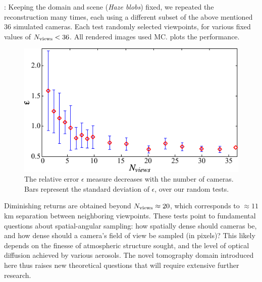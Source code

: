 \documentclass[10pt,letterpaper]{article}
\newcommand{\yoavcomment}[1]{}
\renewcommand{\yoavcomment}[1]{#1} %
\begin{document}
: Keeping the domain and scene ({\em Haze blobs}) fixed, we
repeated the reconstruction many times, each using a different subset of the above mentioned 36 simulated cameras. Each test randomly selected viewpoints, for various fixed values
of $N_{\rm views}< 36$. All rendered images used MC.
 plots the performance.
\begin{figure}[t]
  \centering
  \yoavcomment{\includegraphics{images/error_vs_cameras.pdf}}
  \caption{\small The relative error $\epsilon$ measure decreases with the number of
    cameras. Bars represent the standard deviation of $\epsilon$, over our random tests.}
  \label{fig:error_vs_cameras}
\end{figure}
Diminishing returns are obtained beyond $N_{\rm views}\approx 20$, which corresponds to $\approx 11$km separation between neighboring viewpoints. These tests point to fundamental questions about spatial-angular sampling: how spatially dense should cameras be, and how dense should a camera's field of view be sampled (in pixels)? This likely depends on the finesse of atmospheric structure sought, and the level of optical diffusion achieved by various aerosols. The novel tomography domain introduced here thus raises new theoretical questions that will   require extensive further research.\\
\end{document}
